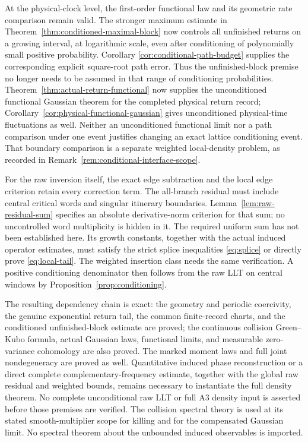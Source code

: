 At the physical-clock level, the first-order functional law and its
geometric rate comparison remain valid. The stronger maximum estimate
in Theorem~\ref{thm:conditioned-maximal-block} now controls all unfinished
returns on a growing interval, at logarithmic scale, even after
conditioning of polynomially small positive probability. Corollary
\ref{cor:conditional-path-budget} supplies the corresponding explicit
square-root path error. Thus the unfinished-block premise no longer
needs to be assumed in that range of conditioning probabilities.
Theorem~\ref{thm:actual-return-functional} now supplies the unconditioned
functional Gaussian theorem for the completed physical return record;
Corollary~\ref{cor:physical-functional-gaussian} gives unconditioned
physical-time fluctuations as well. Neither an unconditioned functional
limit nor a path comparison under one event justifies changing an exact
lattice conditioning event. That boundary comparison is a separate
weighted local-density problem, as recorded in
Remark~\ref{rem:conditional-interface-scope}.

For the raw inversion itself, the exact edge subtraction and the local
edge criterion retain every correction term. The all-branch residual
must include central critical words and singular itinerary boundaries.
Lemma~\ref{lem:raw-residual-sum} specifies an absolute derivative-norm
criterion for that sum; no uncontrolled word multiplicity is hidden in
it. The required uniform sum has not been established here. Its growth
constants, together with the actual induced operator estimates, must
satisfy the strict splice inequalities \eqref{eq:splice} or directly
prove \eqref{eq:local-tail}. The weighted insertion class needs the same
verification. A positive conditioning denominator then follows from the
raw LLT on central windows by Proposition~\ref{prop:conditioning}.

The resulting dependency chain is exact: the geometry and periodic
coercivity, the genuine exponential return tail, the common finite-record
charts, and the conditioned unfinished-block estimate are proved;
the continuous collision Green--Kubo formula, actual Gaussian laws,
functional limits, and measurable zero-variance cohomology are also
proved. The marked moment laws and full joint nondegeneracy are proved
as well. Quantitative induced phase reconstruction or a direct complete
complementary-frequency estimate, together with the global raw residual
and weighted bounds, remains necessary to instantiate the full density
theorem. No complete unconditional raw
LLT or full A3 density input is asserted before those premises are
verified. The collision spectral theory is used at its stated smooth-multiplier
scope for killing and for the compensated Gaussian limit. No spectral
theorem about the unbounded induced observables is imported.

